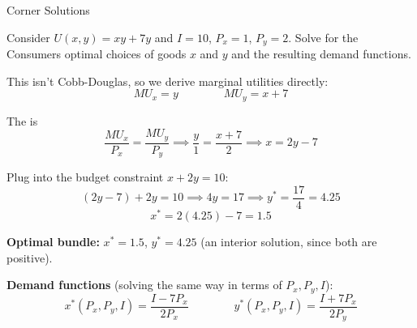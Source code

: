 \documentclass{beamer}
\begin{document}
\begin{frame}{Corner Solutions}
  
  \bigskip
  Consider $U(x,y) = xy + 7y$ and $I=10$, $P_{x} = 1$, $P_{y}=2$. Solve for the Consumers optimal choices of goods $x$ and $y$ and the resulting demand functions.
\end{frame}

\begin{frame}

  \bigskip
  This isn't Cobb-Douglas, so we derive marginal utilities directly:
  $$
    MU_x = y \qquad\qquad MU_y = x + 7
  $$

  \bigskip
  The  is
  $$
    \frac{MU_x}{P_x} = \frac{MU_y}{P_y} \implies \frac{y}{1} = \frac{x+7}{2} \implies x = 2y - 7
  $$
\end{frame}

\begin{frame}

  \bigskip
  Plug into the budget constraint $x + 2y = 10$:
  $$
    (2y - 7) + 2y = 10 \implies 4y = 17 \implies y^* = \frac{17}{4} = 4.25
  $$
  $$
    x^* = 2(4.25) - 7 = 1.5
  $$

  \bigskip
  \textbf{Optimal bundle:} $x^* = 1.5$, $y^* = 4.25$ (an interior solution, since both are positive).

  \bigskip
  \textbf{Demand functions} (solving the same way in terms of $P_x, P_y, I$):
  $$
    x^*(P_x,P_y,I) = \frac{I - 7P_x}{2P_x} \qquad\qquad y^*(P_x,P_y,I) = \frac{I + 7P_x}{2P_y}
  $$
\end{frame}
\end{document}
